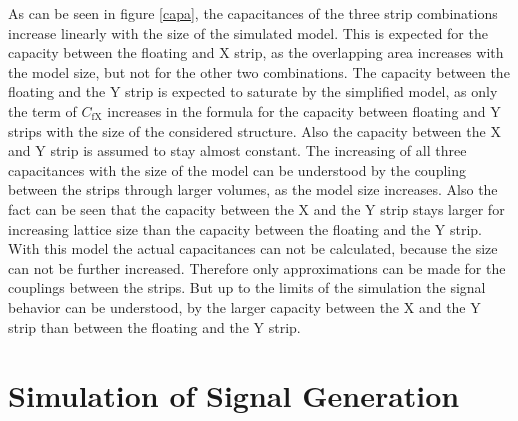 \documentclass[
a4paper,                                %
twoside,                                %
BCOR1.4cm,                      %
10pt,                           %
headings=normal,                %
headsepline,                    %
clearplainpage, %
final,                                  %
div=14,
parskip=full,
openright,
bibliography=toc
]{scrreprt}
\begin{document}
As can be seen in figure \ref{capa}, the capacitances of the three strip combinations increase linearly with the size of the simulated model. This is expected for the capacity between the floating and X strip, as the overlapping area increases with the model size, but not for the other two combinations. The capacity between the floating and the Y strip is expected to saturate by the simplified model, as only the term of $C_{\mathrm{fX}}$ increases in the formula for the capacity between floating and Y strips with the size of the considered structure. Also the capacity between the X and Y strip is assumed to stay almost constant. The increasing of all three capacitances with the size of the model can be understood by the coupling between the strips through larger volumes, as the model size increases. Also the fact can be seen that the capacity between the X and the Y strip stays larger for increasing lattice size than the capacity between the floating and the Y strip. With this model the actual capacitances can not be calculated, because the size can not be further increased. Therefore only approximations can be made for the couplings between the strips. But up to the limits of the simulation the signal behavior can be understood, by the larger capacity between the X and the Y strip than between the floating and the Y strip.

\section{Simulation of Signal Generation}
\end{document}
